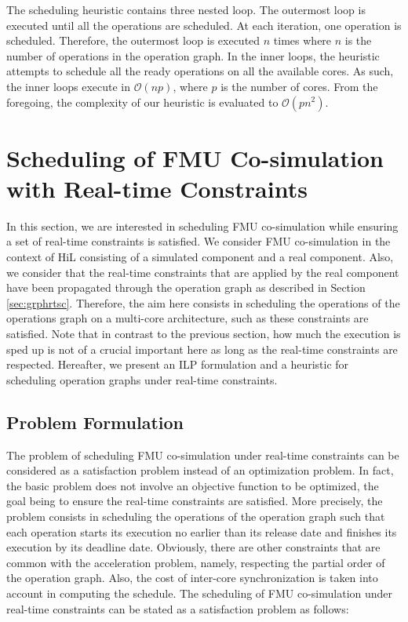 The scheduling heuristic contains three nested loop. The outermost loop is executed until all the operations are scheduled. At each iteration, one operation is scheduled. Therefore, the outermost loop is executed $n$ times where $n$ is the number of operations in the operation graph. In the inner loops, the heuristic attempts to schedule all the ready operations on all the available cores. As such, the inner loops execute in $\mathcal{O}(np)$, where $p$ is the number of cores. From the foregoing, the complexity of our heuristic is evaluated to $\mathcal{O}(pn^2)$.

\section{Scheduling of FMU Co-simulation with Real-time Constraints}

In this section, we are interested in scheduling FMU co-simulation while ensuring a set of real-time constraints  is satisfied. We consider FMU co-simulation in the context of HiL consisting of a simulated component and a real component. Also, we consider that the real-time constraints that are applied by the real component have been propagated through the operation graph as described in Section \ref{sec:grphrtsc}. Therefore, the aim here consists in scheduling the operations of the operations graph on a multi-core architecture, such as these constraints are satisfied. Note that in contrast to the previous section, how much the execution is sped up is not of a crucial important here as long as the real-time constraints are respected. Hereafter, we present an ILP formulation and a heuristic for scheduling operation graphs under real-time constraints.

\subsection{Problem Formulation}

The problem of scheduling FMU co-simulation under real-time constraints can be considered as a satisfaction problem instead of an optimization problem. In fact, the basic problem does not involve an objective function to be optimized, the goal being to ensure the real-time constraints are satisfied. More precisely, the problem consists in scheduling the operations of the operation graph such that each operation starts its execution no earlier than its release date and finishes its execution by its deadline date. Obviously, there are other constraints that are common with the acceleration problem, namely, respecting the partial order of the operation graph. Also, the cost of inter-core synchronization is taken into account in computing the schedule. The scheduling of FMU co-simulation under real-time constraints can be stated as a satisfaction problem as follows:

